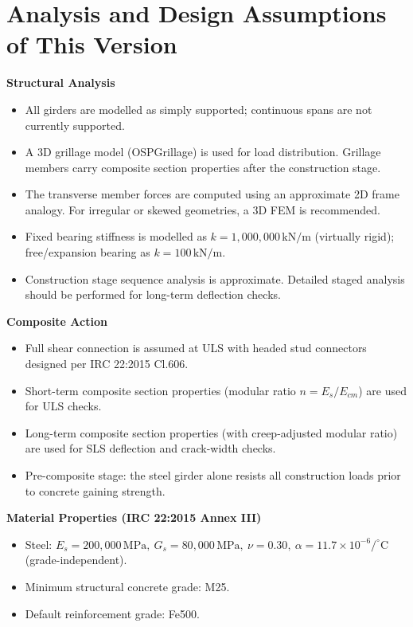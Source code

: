 \documentclass[12pt,a4paper]{report}
\numberwithin{table}{chapter}
\numberwithin{figure}{chapter}
\begin{document}
\clearpage
{}
\section{Analysis and Design Assumptions of This Version}
\label{sec:assumptions}

\textbf{Structural Analysis}

\begin{itemize}
    \item All girders are modelled as simply supported; continuous spans are not currently supported.
    \item A 3D grillage model (OSPGrillage) is used for load distribution. Grillage members carry composite section properties after the construction stage.
    \item The transverse member forces are computed using an approximate 2D frame analogy. For irregular or skewed geometries, a 3D FEM is recommended.
    \item Fixed bearing stiffness is modelled as $k = 1{,}000{,}000 \,\text{kN/m}$ (virtually rigid); free/expansion bearing as $k = 100 \, \text{kN/m}$.
    \item Construction stage sequence analysis is approximate. Detailed staged analysis should be performed for long-term deflection checks.
\end{itemize}

\textbf{Composite Action}

\begin{itemize}
    \item Full shear connection is assumed at ULS with headed stud connectors designed per IRC 22:2015 Cl.606.
    \item Short-term composite section properties (modular ratio $n = E_s/E_{cm}$) are used for ULS checks.
    \item Long-term composite section properties (with creep-adjusted modular ratio) are used for SLS deflection and crack-width checks.
    \item Pre-composite stage: the steel girder alone resists all construction loads prior to concrete gaining strength.
\end{itemize}


\textbf{Material Properties (IRC 22:2015 Annex III)}

\begin{itemize}
\item Steel: $E_s = 200{,}000 \, \text{MPa}, \ G_s = 80{,}000 \, \text{MPa}, \ \nu = 0.30, \ \alpha = 11.7 \times 10^{-6}/^\circ\mathrm{C}$ (grade-independent).
\item Minimum structural concrete grade: M25.
\item Default reinforcement grade: Fe500.
\end{itemize}
\end{document}
